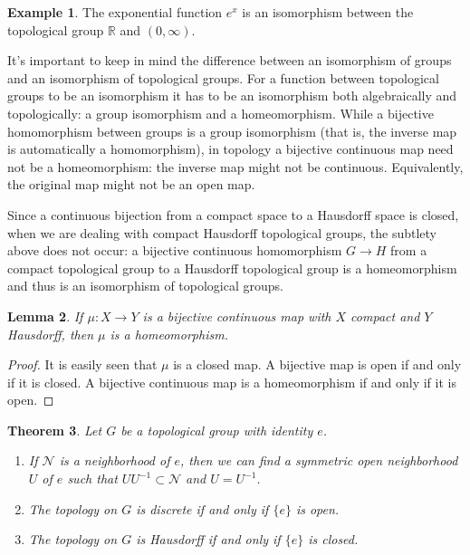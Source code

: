 \documentclass[12pt]{report}
\newtheorem{theorem}{Theorem}[section]
\newtheorem{lemma}[theorem]{Lemma}
\theoremstyle{definition}
\newtheorem{example}[theorem]{Example}
\newcommand{\RR}{\mathbb{R}}
\begin{document}
\begin{example}
	The exponential function $e^x$ is an isomorphism between the topological group $\RR$ and $(0,\infty)$.
\end{example}

It's important to keep in mind the difference between an isomorphism of groups and an isomorphism of topological groups. For a function between topological groups to be an isomorphism it has to be an isomorphism both algebraically and topologically: a group isomorphism and a homeomorphism. While a bijective homomorphism between groups is a
group isomorphism (that is, the inverse map is automatically a homomorphism), in topology a bijective continuous map need not be a homeomorphism: the inverse map might not be continuous. Equivalently, the original map might not be an open map.

Since a continuous bijection from a compact space to a Hausdorff space is closed, when we are dealing with compact Hausdorff topological groups, the subtlety above does not occur: a bijective continuous homomorphism $G \to H$ from a compact topological group to a Hausdorff topological group is a homeomorphism and thus is an isomorphism of topological groups.

\begin{lemma}\label{26.9}
	If $\mu: X\to Y$ is a bijective continuous map with $X$ compact and $Y$ Hausdorff, then $\mu$ is a homeomorphism.
\end{lemma}

\begin{proof}
	It is easily seen that $\mu$ is a closed map. A bijective map is open if and only if it is closed. A bijective continuous map is a homeomorphism if and only if it is open.
\end{proof}

\begin{theorem}\label{26.10}
	Let $G$ be a topological group with identity $e$.
	\begin{enumerate}
		\item If $\mathcal{N}$ is a neighborhood of $e$, then we can find a symmetric open neighborhood $U$ of $e$ such that $UU^{-1}\subset \mathcal{N}$ and $U=U^{-1}$.
		\item The topology on $G$ is discrete if and only if $\{e\}$ is open.
		\item The topology on $G$ is Hausdorff if and only if $\{e\}$ is closed.
	\end{enumerate}
\end{theorem}
\end{document}
